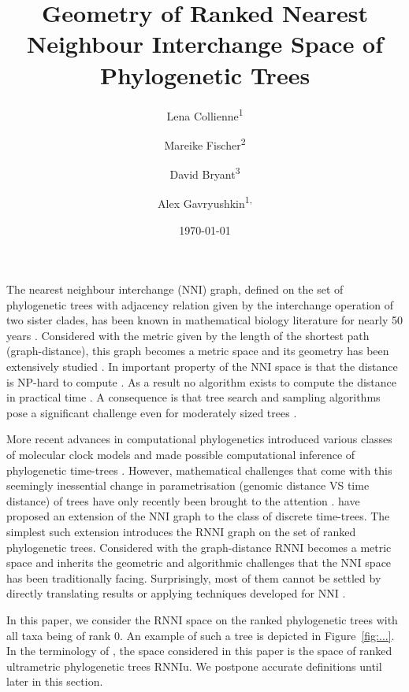 \documentclass{amsart}
\title[Ranked Nearest Neighbour Intarchange]{Geometry of Ranked Nearest Neighbour Interchange Space of Phylogenetic Trees}
\date{\today}
\author{Lena Collienne\textsuperscript{1}}
\author{Mareike Fischer\textsuperscript{2}}
\author{David Bryant\textsuperscript{3}}
\author{Alex Gavryushkin\textsuperscript{1, \Letter}}
\newcommand{\nni}{\mathrm{NNI}}
\newcommand{\rnni}{\mathrm{RNNI}}
\newcommand{\rnniu}{\mathrm{RNNIu}}
\begin{document}
\maketitle

\begin{abstract}

\end{abstract}

The nearest neighbour interchange ($\nni$) graph, defined on the set of phylogenetic trees with adjacency relation given by the interchange operation of two sister clades, has been known in mathematical biology literature for nearly 50 years \autocite{Robinson1971, Moore-Goodman-Barnabas1973}.
Considered with the metric given by the length of the shortest path (graph-distance), this graph becomes a metric space and its geometry has been extensively studied \autocite{...}.
In important property of the $\nni$ space is that the distance is NP-hard to compute \autocite{...}.
As a result no algorithm exists to compute the distance in practical time \autocite{...Whidden may be}.
A consequence is that tree search and sampling algorithms pose a significant challenge even for moderately sized trees \autocite{...}.

More recent advances in computational phylogenetics introduced various classes of molecular clock models \autocite{...} and made possible computational inference of phylogenetic time-trees \autocite{...}.
However, mathematical challenges that come with this seemingly inessential change in parametrisation (genomic distance VS time distance) of trees have only recently been brought to the attention \autocite{Gavryushkin2016-uu}.
\textcite{Gavryushkin2018-ol} have proposed an extension of the $\nni$ graph to the class of discrete time-trees.
The simplest such extension introduces the $\rnni$ graph on the set of ranked phylogenetic trees.
Considered with the graph-distance $\rnni$ becomes a metric space and inherits the geometric and algorithmic challenges that the $\nni$ space has been traditionally facing.
Surprisingly, most of them cannot be settled by directly translating results or applying techniques developed for $\nni$ \autocite{Gavryushkin2018-ol}.

In this paper, we consider the $\rnni$ space on the ranked phylogenetic trees with all taxa being of rank $0$.
An example of such a tree is depicted in Figure~\ref{fig:...}.
In the terminology of \autocite{Gavryushkin2018-ol}, the space considered in this paper is the space of ranked ultrametric phylogenetic trees $\rnniu$.
We postpone accurate definitions until later in this section.
\end{document}
